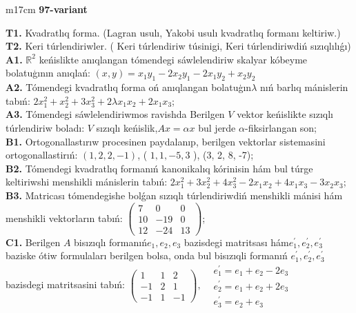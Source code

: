 \documentclass{article}
\begin{document}
\begin{tabular}{m{17cm}}
\textbf{97-variant}
\newline

\textbf{T1.} Kvadratlıq forma. (Lagran usulı, Yakobi usulı kvadratlıq formanı keltiriw.) \\
\textbf{T2.} Keri túrlendiriwler. ( Keri túrlendiriw túsinigi,   Keri túrlendiriwdiń sızıqlılıǵı) \\
\textbf{A1.} \(\mathbb{R}^{2}\) keńislikte anıqlangan tómendegi sáwlelendiriw skalyar kóbeyme bolatuģının anıqlań: \((x,y) = x_{1}y_{1} - 2x_{2}y_{1} - 2x_{1}y_{2} + x_{2}y_{2}\) \\
\textbf{A2.} Tómendegi kvadratlıq forma oń anıqlangan bolatuģın\(\lambda\) nıń barlıq mánislerin tabıń: \(2x_{1}^{2} + x_{2}^{2} + 3x_{3}^{2} + 2\lambda x_{1}x_{2} + 2x_{1}x_{3}\); \\
\textbf{A3.} Tómendegi sáwlelendiriwmos ravishda Berilgen \(V\) vektor keńislikte sızıqlı túrlendiriw boladı: \(V\) sızıqlı keńislik,\(Ax = \alpha x\) bul jerde \(\alpha\)-fiksirlangan son; \\
\textbf{B1.} Ortogonallastırıw procesinen paydalanıp, berilgen vektorlar sistemasini ortogonallastirıń: \((1,2,2, - 1)\), ( \(1,1, - 5,3\) ), (3, 2, 8, -7); \\
\textbf{B2.} Tómendegi kvadratlıq formanıń kanonikalıq kórinisin hám bul túrge keltiriwshi menshikli mánislerin tabıń: \(2x_{1}^{2} + 3x_{2}^{2} + 4x_{3}^{2} - 2x_{1}x_{2} + 4x_{1}x_{3} - 3x_{2}x_{3}\); \\
\textbf{B3.} Matricası tómendegishe bolǵan sızıqlı túrlendiriwdiń menshikli mánisi hám menshikli vektorların tabıń: \(\begin{pmatrix} 7 & 0 & 0 \\ 10 & - 19 & 0 \\ 12 & - 24 & 13 \end{pmatrix}\); \\
\textbf{C1.} Berilgen \(A\) bisızıqlı formanıń\(e_{1},e_{2},e_{3}\) bazisdegi matritsası hám\(e_{1}^{'},e_{2}^{'},e_{3}^{'}\) baziske ótiw formulaları berilgen bolsa, onda bul bisızıqli formanıń \(e_{1}^{'},e_{2}^{'},e_{3}^{'}\) bazisdegi matritsasini tabıń: \(\begin{pmatrix} 1 & 1 & 2 \\  - 1 & 2 & 1 \\  - 1 & 1 & - 1 \end{pmatrix},\begin{matrix}  & e_{1}^{'} = e_{1} + e_{2} - 2e_{3} \\  & e_{2}^{'} = e_{1} + e_{2} + 2e_{3} \\  & e_{3}^{'} = e_{2} + e_{3} \end{matrix}\) \\

\end{tabular}
\end{document}
